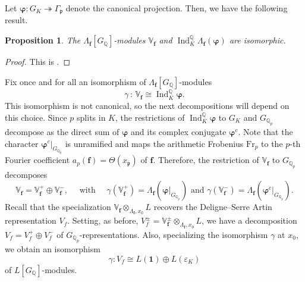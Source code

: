 \documentclass[a4paper,11pt]{amsart}
\theoremstyle{plain}
\newtheorem{proposition}[theorem]{Proposition}
\theoremstyle{definition}
\theoremstyle{remark}
\newcommand{\bb}{\mathbb}
\newcommand{\frk}{\mathfrak}
\DeclareMathOperator{\Ind}{Ind}
\newcommand{\Fr}{\mathrm{Fr}}
\newcommand{\hf}{{\mathbf{f}}}
\newcommand{\hg}{{\mathbf{g}}}
\newcommand{\hh}{{\mathbf h}}
\numberwithin{equation}{section}
\begin{document}
Let $\bm{\varphi}:G_K\twoheadrightarrow \Gamma_{\frk{p}}$ denote the canonical projection. Then, we have the following result.

\begin{proposition}\label{prop:BSTW}
The $\Lambda_{\hf}[G_{\mathbb Q}]$-modules $\bb{V}_{\hf}$ and $\Ind_K^{\mathbb Q} \Lambda_\hf(\bm{\varphi})$ are isomorphic.
\end{proposition}
\begin{proof}
This is \cite[Thm.~1.21]{BSTW}. %
\end{proof}

Fix once and for all an isomorphism of $\Lambda_{\hf}[G_{\mathbb Q}]$-modules 
\begin{equation}\label{eq:iso}
\gamma \, : \, \bb{V}_{\hf} \cong \Ind_K^{\mathbb Q} \bm{\varphi}.
\end{equation}
This isomorphism is not canonical, so the next decompositions will depend on this choice.
Since $p$ splits in $K$, the restrictions of $\Ind_K^{\mathbb Q} \bm{\varphi}$ to $G_K$ and $G_{\mathbb Q_p}$ decompose as the direct sum of $\bm{\varphi}$ and its complex conjugate $\bm{\varphi}^c$. Note that the character $\bm{\varphi}^c|_{G_{\mathbb Q_p}}$ is unramified and maps the arithmetic Frobenius $\Fr_p$ to the $p$-th Fourier coefficient $a_p(\hf) = \Theta(x_{\bar{\mathfrak p}})$ of $\hf$. Therefore, the restriction of $\bb{V}_{\hf}$ to $G_{\bb{Q}_p}$ decomposes
\[
\bb{V}_{\hf} = \bb{V}_{\hf}^+ \oplus \bb{V}_{\hf}^-, \quad \text{ with } \quad \gamma(\bb{V}_{\hf}^+) = \Lambda_{\hf}(\bm{\varphi}|_{G_{\mathbb Q_p}}) \text{ and } \gamma(\bb{V}_{\hf}^-) = \Lambda_\hf(\bm{\varphi}^c|_{G_{\mathbb Q_p}}).
\]
Recall that the specialization $\bb{V}_{\hf}\otimes_{\Lambda_{\hf},x_0} L$ recovers the Deligne--Serre Artin representation $V_f$. Setting, as before, $V_f^{\pm}=\bb{V}_{\hf}^{\pm}\otimes_{\Lambda_{\hf},x_0} L$, we have a decomposition $V_f=V_f^+\oplus V_f^-$ of $G_{\bb{Q}_p}$-representations. Also, specializing the isomorphism $\gamma$ at $x_0$, we obtain an isomorphism
\[
\gamma:V_f\cong L(\bm{1})\oplus L(\varepsilon_K) 
\]
of $L[G_{\bb{Q}}]$-modules.
\end{document}
